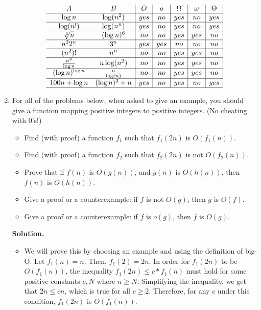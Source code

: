 \documentclass[11pt]{article}
\newcommand\solution{%
  \textbf{Solution.}\\%
}
\begin{document}
\begin{enumerate}
$$
\begin{array}{cc|c|c|c|c|c|}
A & B & O & o & \Omega & \omega & \Theta \\ \hline
\log{n} & \log(n^2) & yes & no & yes & no & yes \\ \hline
\log (n!) & \log(n^n) & yes & no & yes & no & yes \\ \hline
\sqrt[3]{n} & (\log n)^{6} & no & no & yes & yes & no \\ \hline
n^22^n & 3^n & yes & yes & no & no & no \\ \hline
(n^2)! & n^n & no & no & yes & yes & no \\ \hline
{n^2 \over \log{n}} & n \log(n^2) & no & no & yes & yes & no \\ \hline
(\log n)^{\log n} & {n \over \log(n)} & no & no & yes & yes & no \\ \hline
100n + \log n & (\log n)^{3} + n & yes & no & yes & no & yes \\ \hline
\end{array}
$$

\item 
For all of the problems below, when asked to give an example, you
should give a function mapping positive integers to positive integers.
(No cheating with 0's!)
\begin{itemize}
\item Find (with proof) a function $f_1$ such that $f_1(2n)$ is $O(f_1(n))$.
\item Find (with proof) a function $f_2$ such that $f_2(2n)$ is not $O(f_2(n))$.
\item Prove that if $f(n)$ is $O(g(n))$, and $g(n)$ is $O(h(n))$, then 
$f(n)$ is $O(h(n))$.  
\item Give a proof or a counterexample:  if $f$ is not $O(g)$, then $g$ is $O(f)$.  
\item Give a proof or a counterexample:  if $f$ is $o(g)$, then $f$ is $O(g)$.  \end{itemize}

\solution \begin{itemize}
\item
We will prove this by choosing an example and using the definition of big-O. Let $f_1(n) = n$. Then, $f_1(2) = 2n$. In order for $f_1(2n)$ to be $O(f_1(n))$, the inequality $f_1(2n) \leq c*f_1(n)$ must hold for some positive constants $c, N$ where $n \geq N$. Simplifying the inequality, we get that $2n \leq cn$, which is true for all $c \geq 2$. Therefore, for any $c$ under this condition, $f_1(2n)$ is $O(f_1(n))$. 


\end{itemize}
\end{enumerate}
\end{document}
